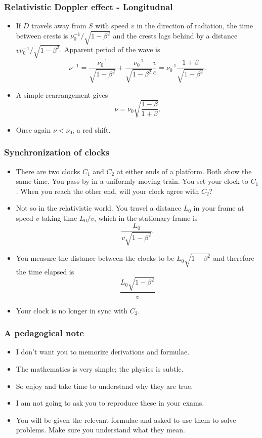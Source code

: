 \documentclass{beamer}
\begin{document}
\begin{frame}
\frametitle{Relativistic Doppler effect - Longitudnal}
\begin{itemize}
\item If $D$ travels away from $S$ with speed $v$ in the direction of radiation,
the time between crests is $\nu_0^{-1}/\sqrt{1-\beta^2}$ and the crests lags
behind by a distance $v\nu_0^{-1}/\sqrt{1-\beta^2}$. Apparent period of the wave
is
\begin{equation}\label{e4}
\nu^{-1} = \frac{\nu_0^{-1}}{\sqrt{1-\beta^2}} + 
           \frac{\nu_0^{-1}}{\sqrt{1-\beta^2}}\frac{v}{c} = 
           \nu_0^{-1}\frac{1+\beta}{\sqrt{1-\beta^2}}.
\end{equation}
\item A simple rearrangement gives
\begin{equation}\label{e5}
\nu = \nu_0\sqrt{\frac{1 - \beta}{1 + \beta}}.
\end{equation}
\item Once again $\nu < \nu_0$, a red shift.
\end{itemize}
\end{frame}

\begin{frame}
\frametitle{Synchronization of clocks}
\begin{itemize}
\item There are two clocks $C_1$ and $C_2$ at either ends of a platform. Both
show the same time. You pass by in a uniformly moving train. You set your clock 
to $C_1$. When you reach the other end, will your clock agree with $C_2$?
\item Not so in the relativistic world. You travel a distance $L_0$ in your
frame at speed $v$ taking time $L_0/v$, which in the stationary frame is
\[
\frac{L_0}{v\sqrt{1-\beta^2}}.
\]
\item You measure the distance between the clocks to be $L_0\sqrt{1-\beta^2}$
and therefore the time elapsed is
\[
\frac{L_0\sqrt{1 - \beta^2}}{v}
\]
\item Your clock is no longer in sync with $C_2$.
\end{itemize}
\end{frame}

\begin{frame}
\frametitle{A pedagogical note}
\begin{itemize}
\item I don't want you to memorize derivations and formulae.
\item The mathematics is very simple; the physics is subtle.
\item So enjoy and take time to understand why they are true.
\item I am not going to ask you to reproduce these in your exams.
\item You will be given the relevant formulae and asked to use them to solve
problems. Make sure you understand what they mean.
\end{itemize}
\end{frame}
\end{document}

